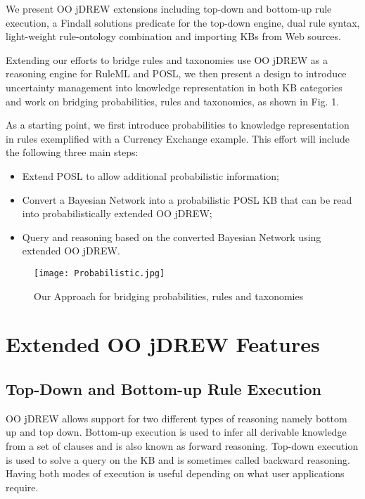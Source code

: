 \documentclass [letterpaper] {Article}
\begin{document}
\begin{small}
\hspace{0.3in}We present OO jDREW extensions including top-down and bottom-up rule execution, a Findall solutions predicate for the top-down engine, dual rule syntax, light-weight rule-ontology combination and importing KBs from Web sources.

\hspace{0.3in}Extending our efforts to bridge rules and taxonomies use OO jDREW as a reasoning engine for RuleML and POSL, we then present a design to introduce uncertainty management into knowledge representation in both KB categories and work on bridging probabilities, rules and taxonomies, as shown in Fig. 1.

\hspace{0.3in}As a starting point, we first introduce probabilities to knowledge representation in rules exemplified with a Currency Exchange example. This effort will include the following three main steps:

\begin{itemize}
\item Extend POSL to allow additional probabilistic information;
\item Convert a Bayesian Network into a probabilistic POSL KB that can be read into probabilistically extended OO jDREW;
\item Query and reasoning based on the converted Bayesian Network using extended OO jDREW.
\end{itemize}


\begin{figure}
\begin{center}
\texttt{[image: Probabilistic.jpg]}
\caption {Our Approach for bridging probabilities, rules and taxonomies}
\label{fig:1Fig1}
\end{center}
\end{figure}

\section{Extended OO jDREW Features}

\subsection{Top-Down and Bottom-up Rule Execution}

\hspace{0.3in}OO jDREW allows support for two different types of reasoning namely bottom up and top down. Bottom-up execution is used to infer all derivable knowledge from a set of clauses and is also known as forward reasoning. Top-down execution is used to solve a query on the KB and is sometimes called backward reasoning. Having both modes of execution is useful depending on what user applications require.  


\end{small}
\end{document}
